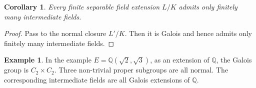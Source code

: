 \documentclass[12pt]{report}
\newtheorem{cor}[thm]{Corollary}
\theoremstyle{definition}
\newtheorem{example}[thm]{Example}
\def\QQ{\mathbb{Q}}
\begin{document}
\begin{cor}
    Every finite separable field extension $L/K$ admits only finitely many intermediate fields.
\end{cor}

\begin{proof}
    Pass to the normal closure $L'/K$. Then it is Galois and hence admits only finitely many intermediate fields. 
\end{proof}

\begin{example}
    In the example $E=\QQ(\sqrt{2},\sqrt{3})$, as an extension of $\QQ$, the Galois group is $C_2\times C_2$. Three non-trivial proper subgroups are all normal. The corresponding intermediate fields are all Galois extensions of $\QQ$.
\end{example}
\end{document}
